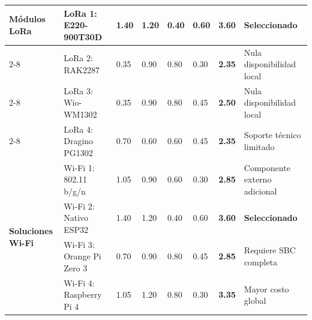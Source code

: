 \begin{landscape}
\begin{table}[H]
\begin{tabular}{|p{2.8cm}|p{3.5cm}|p{1.5cm}|p{1.5cm}|p{1.5cm}|p{1.5cm}|p{1.5cm}|p{3.8cm}|}
            \multirow{4}{*}{\parbox{2.8cm}{\textbf{Módulos LoRa}}}
                             & \cellcolor{green!15} LoRa 1: E220-900T30D  & \cellcolor{green!15} 1.40   & \cellcolor{green!15} 1.20         & \cellcolor{green!15} 0.40        & \cellcolor{green!15} 0.60       & \cellcolor{green!15} \textbf{3.60} & \cellcolor{green!15} \textbf{Seleccionado} \\ \cline{2-8}
                             & LoRa 2: RAK2287                            & 0.35                        & 0.90                              & 0.80                             & 0.30                            & \textbf{2.35}                      & Nula disponibilidad local                  \\ \cline{2-8}
                             & LoRa 3: Wio-WM1302                         & 0.35                        & 0.90                              & 0.80                             & 0.45                            & \textbf{2.50}                      & Nula disponibilidad local                  \\ \cline{2-8}
                             & LoRa 4: Dragino PG1302                     & 0.70                        & 0.60                              & 0.60                             & 0.45                            & \textbf{2.35}                      & Soporte técnico limitado                   \\ \hline

            \multirow{4}{*}{\parbox{2.8cm}{\textbf{Soluciones Wi-Fi}}}
                             & Wi-Fi 1: 802.11 b/g/n                      & 1.05                        & 0.90                              & 0.60                             & 0.30                            & \textbf{2.85}                      & Componente externo adicional               \\ \cline{2-8}
                             & \cellcolor{green!15} Wi-Fi 2: Nativo ESP32 & \cellcolor{green!15} 1.40   & \cellcolor{green!15} 1.20         & \cellcolor{green!15} 0.40        & \cellcolor{green!15} 0.60       & \cellcolor{green!15} \textbf{3.60} & \cellcolor{green!15} \textbf{Seleccionado} \\ \cline{2-8}
                             & Wi-Fi 3: Orange Pi Zero 3                  & 0.70                        & 0.90                              & 0.80                             & 0.45                            & \textbf{2.85}                      & Requiere SBC completa                      \\ \cline{2-8}
                             & Wi-Fi 4: Raspberry Pi 4                    & 1.05                        & 1.20                              & 0.80                             & 0.30                            & \textbf{3.35}                      & Mayor costo global                         \\ \hline
        \end{tabular}
    \end{table}
\end{landscape}
